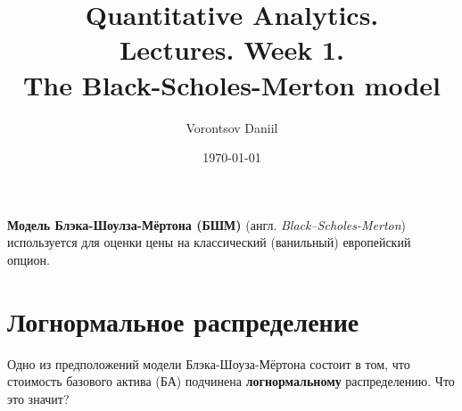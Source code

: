 \documentclass{article}
\title{Quantitative Analytics.\\
Lectures. Week 1. \\
The Black-Scholes-Merton model}
\author{Vorontsov Daniil}
\date{\today}
\begin{document}
\maketitle
\setcounter{tocdepth}{1} %
\renewcommand\contentsname{Contents}
\tableofcontents
\newpage\textbf{Модель Блэка-Шоулза-Мёртона (БШМ)} (англ. \textit{Black–Scholes-Merton}) используется для оценки цены на классический (ванильный) европейский опцион.

\section{Логнормальное распределение}
Одно из предположений модели Блэка-Шоуза-Мёртона состоит в том, что стоимость базового актива (БА) подчинена \textbf{логнормальному} распределению. Что это значит?\\
\end{document}
